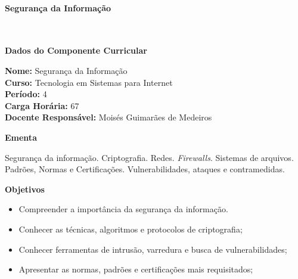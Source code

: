 \paragraph{Segurança da Informação} \


\begin{snugshade}\begin{center}\textbf{
    Dados do Componente Curricular
}\end{center}\end{snugshade}

\noindent \textbf{Nome:}                Segurança da Informação
\\        \textbf{Curso:}               Tecnologia em Sistemas para Internet
\\        \textbf{Período:}             \unit{4}{\degree}
\\        \textbf{Carga Horária:}       \unit{67}{\hour}
\\        \textbf{Docente Responsável:} Moisés Guimarães de Medeiros


\begin{snugshade}\begin{center}\textbf{
    Ementa
\vphantom{q}}\end{center}\end{snugshade}

\noindent
Segurança da informação. Criptografia. Redes. \textit{Firewalls}. Sistemas de arquivos. Padrões, Normas e Certificações. Vulnerabilidades, ataques e contramedidas.


\begin{snugshade}\begin{center}\textbf{
    Objetivos
}\end{center}\end{snugshade}

\begin{itemize}

\item Compreender a importância da segurança da informação.

\item Conhecer as técnicas, algoritmos e protocolos de criptografia;

\item Conhecer ferramentas de intrusão, varredura e busca de vulnerabilidades;

\item Apresentar as normas, padrões e certificações mais requisitados;

\end{itemize}

